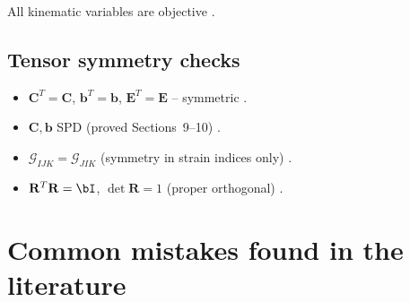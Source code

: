 \documentclass[11pt]{article}
\newcommand{\bC}{\mathbf{C}}
\newcommand{\bb}{\mathbf{b}}
\newcommand{\bE}{\mathbf{E}}
\newcommand{\bR}{\mathbf{R}}
\newcommand{\bC}{\mathbf{C}}
\newcommand{\bb}{\mathbf{b}}
\newcommand{\bE}{\mathbf{E}}
\newcommand{\bR}{\mathbf{R}}
\begin{document}
All kinematic variables are objective \checkmark
\cite{MarsdenHughes1983,Holzapfel2000}.

\subsection{Tensor symmetry checks}

\begin{itemize}
\item $\bC^{T}=\bC$, $\bb^{T}=\bb$, $\bE^{T}=\bE$ -- symmetric
\checkmark.

\item $\bC,\bb$ SPD (proved Sections~9--10) \checkmark.

\item $\bm{\mathcal{G}}_{IJK}=\bm{\mathcal{G}}_{JIK}$ (symmetry in strain indices only)
\checkmark.

\item $\bR^{T}\bR=\bI$, $\det\bR=1$ (proper orthogonal) \checkmark.
\end{itemize}

\section{Common mistakes found in the literature}
\end{document}
